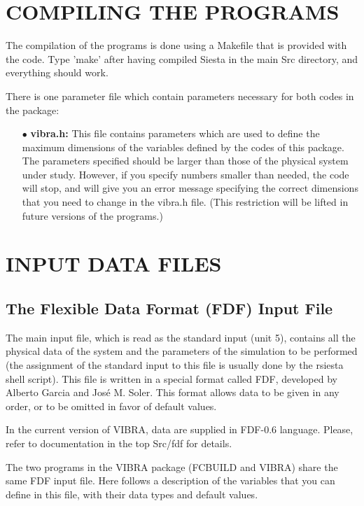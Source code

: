 \section{COMPILING THE PROGRAMS}

\noindent
The compilation of the programs is done using a Makefile
that is provided with the code. Type 'make' after having
compiled Siesta in the main Src directory, and everything
should work.

\noindent
There is  one parameter file which contain
parameters necessary for both codes in the package:

\begin{itemize}

\item[$\bullet$] {\bf vibra.h:}
This file contains parameters which are used
to define the maximum dimensions of the variables defined 
by the codes of this package. 
The parameters specified should be larger than
those of the physical system under study.  However, if you 
specify numbers smaller than needed, the code will stop, 
and will give you an error message specifying the correct
dimensions that you need to change in the vibra.h file.
(This restriction will be lifted in future versions of
the programs.)

\end{itemize}


\section{INPUT DATA FILES}

\subsection{The Flexible Data Format (FDF) Input File}

\noindent
The main input file, which is read as the standard input (unit 5),
contains all the physical data of the system and the parameters of 
the simulation to be performed (the assignment of the standard
input to this file is usually done by the rsiesta shell script).
This file is written in a special format called FDF, developed by 
Alberto Garcia and Jos\'e M. Soler. This format allows data to be 
given in any order, or to be omitted in favor of default values.

\noindent
In the current version of VIBRA, data are 
supplied in FDF-0.6 language.
Please, refer to documentation in the top Src/fdf for details.

\noindent
The two programs in the VIBRA package (FCBUILD and VIBRA)
share the same FDF input file. 
Here follows a description of the variables that you can
define in this file, with their data types and
default values.

